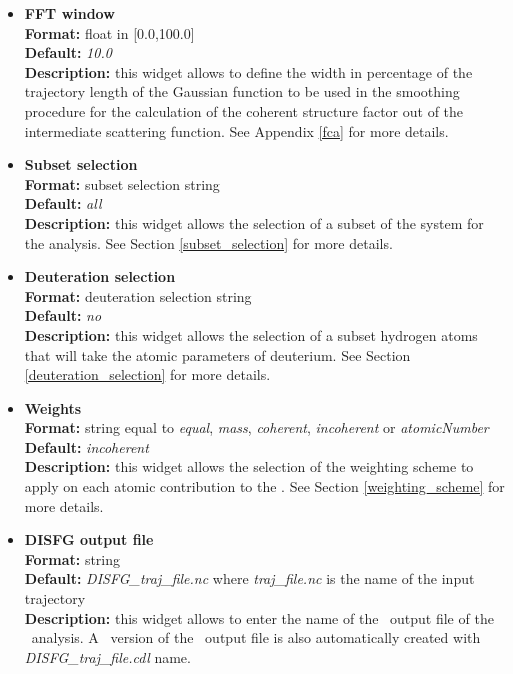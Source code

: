 \documentclass[a4paper,11pt]{report}
\newcommand{\qshells}{\textit{q}-shells}
\begin{document}
\begin{itemize}
For example,
\begin{itemize}
\item \textit{0:10:1} will generate \qshells\ of radii 0, 1, 2, 3, 4, 5, 6, 7, 8, 9, 10.
\item \textit{3:12:2} will generate \qshells\ of radii 3, 5, 7, 9, 11.
\end{itemize}

\item \textbf{FFT window}\\
\textbf{Format:} float in [0.0,100.0]\\
\textbf{Default:} \textit{10.0}\\
\textbf{Description:} this widget allows to define the width in percentage of the trajectory length of the Gaussian 
function to be used in the smoothing procedure for the calculation of the coherent structure factor out of the intermediate 
scattering function. See Appendix \ref{fca} for more details.

\item \textbf{Subset selection}\\
\textbf{Format:} subset selection string\\
\textbf{Default:} \textit{all}\\
\textbf{Description:} this widget allows the selection of a subset of the system for the analysis. 
See Section \ref{subset_selection} for more details.

\item \textbf{Deuteration selection}\\
\textbf{Format:} deuteration selection string\\
\textbf{Default:} \textit{no}\\
\textbf{Description:} this widget allows the selection of a subset hydrogen atoms that will take the atomic parameters 
of deuterium. See Section \ref{deuteration_selection} for more details.

\item \textbf{Weights}\\
\textbf{Format:} string equal to \textit{equal}, \textit{mass}, \textit{coherent}, \textit{incoherent} or \textit{atomicNumber}\\
\textbf{Default:} \textit{incoherent}\\
\textbf{Description:} this widget allows the selection of the weighting scheme to apply on each atomic contribution 
to the \DISFG . See Section \ref{weighting_scheme} for more details. 

\item \textbf{DISFG output file}\\
\textbf{Format:} string\\
\textbf{Default:} \textit{DISFG\_traj\_file.nc} where \textit{traj\_file.nc} is the name of the input trajectory\\
\textbf{Description:} this widget allows to enter the name of the \NetCDF\ output file of the \DISFG\ analysis. A \CDL\ 
version of the \NetCDF\ output file is also automatically created with \textit{DISFG\_traj\_file.cdl} name.
\end{itemize}
\end{document}
